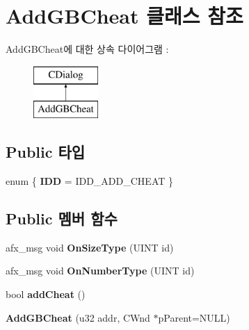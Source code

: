 \hypertarget{class_add_g_b_cheat}{}\section{Add\+G\+B\+Cheat 클래스 참조}
\label{class_add_g_b_cheat}
Add\+G\+B\+Cheat에 대한 상속 다이어그램 \+: \begin{figure}[H]
\begin{center}
\leavevmode
\includegraphics[height=2.000000cm]{class_add_g_b_cheat}
\end{center}
\end{figure}
\subsection*{Public 타입}
\begin{DoxyCompactItemize}
\item 
\mbox{\label{class_add_g_b_cheat_ae307c54936e2ef002f6323ab0d1fa05e}} 
enum \{ {\bfseries I\+DD} = I\+D\+D\+\_\+\+A\+D\+D\+\_\+\+C\+H\+E\+AT
 \}
\end{DoxyCompactItemize}
\subsection*{Public 멤버 함수}
\begin{DoxyCompactItemize}
\item 
\mbox{\label{class_add_g_b_cheat_a9bff22f01c72ffbcd6071bb604c2e090}} 
afx\+\_\+msg void {\bfseries On\+Size\+Type} (U\+I\+NT id)
\item 
\mbox{\label{class_add_g_b_cheat_a1bfddb9d66e182dedc95bf889dc9e6d2}} 
afx\+\_\+msg void {\bfseries On\+Number\+Type} (U\+I\+NT id)
\item 
\mbox{\label{class_add_g_b_cheat_a054ba5040a40f7ef4b3a0ddb5a458592}} 
bool {\bfseries add\+Cheat} ()
\item 
\mbox{\label{class_add_g_b_cheat_a1794ccc1e4826b5a8b179d20557955b8}} 
{\bfseries Add\+G\+B\+Cheat} (u32 addr, C\+Wnd $\ast$p\+Parent=N\+U\+LL)
\end{DoxyCompactItemize}
